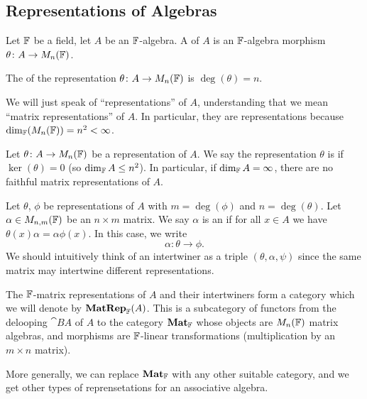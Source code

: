 \subsection{Representations of Algebras}

\begin{definition}
Let $\mathbb{F}$ be a field, let $A$ be an $\mathbb{F}$-algebra. A 
of $A$ is an $\mathbb{F}$-algebra morphism $\theta\colon A\to M_{n}(\mathbb{F})$.

The  of the representation $\theta\colon A\to M_{n}(\mathbb{F})$
is $\deg(\theta)=n$.
\end{definition}

\begin{node}
We will just speak of ``representations'' of $A$, understanding that
we mean ``matrix representations'' of $A$. In particular, they are
 representations because
$\dim_{\mathbb{F}}(M_{n}(\mathbb{F}))=n^{2}<\infty$. 
\end{node}

\begin{definition}
Let $\theta\colon A\to M_{n}(\mathbb{F})$ be a representation of $A$. We say
the representation $\theta$ is  if $\ker(\theta)=0$
(so $\dim_{\mathbb{F}}A\leq n^{2}$). In particular, if $\dim_{\mathbb{F}}A=\infty$,
there are no faithful matrix representations of $A$.
\end{definition}

\begin{definition}
Let $\theta$, $\phi$ be representations of $A$ with $m=\deg(\phi)$ and
$n=\deg(\theta)$. Let $\alpha\in M_{n,m}(\mathbb{F})$ be an $n\times m$
matrix. We say $\alpha$ is an  if for all $x\in A$
we have $\theta(x)\alpha=\alpha\phi(x)$. In this case, we write
\begin{equation}
\alpha\colon\theta\to\phi.
\end{equation}
We should intuitively think of an intertwiner as a triple
$(\theta,\alpha,\psi)$ since the same matrix may intertwine different
representations. 
\end{definition}

\begin{fact}
The $\mathbb{F}$-matrix representations of $A$ and their intertwiners form a
category which we will denote by $\operatorname{\textup{\textbf{MatRep}}}_{\mathbb{F}}(A)$. This is a
subcategory of functors from the delooping $\cat{B}A$ of $A$ to the
category $\operatorname{\textup{\textbf{Mat}}}_{\mathbb{F}}$ whose objects are $M_{n}(\mathbb{F})$ matrix
algebras, and morphisms are $\mathbb{F}$-linear transformations
(multiplication by an $m\times n$ matrix).

More generally, we can replace $\operatorname{\textup{\textbf{Mat}}}_{\mathbb{F}}$ with any other
suitable category, and we get other types of reprensetations for
an associative algebra.
\end{fact}

